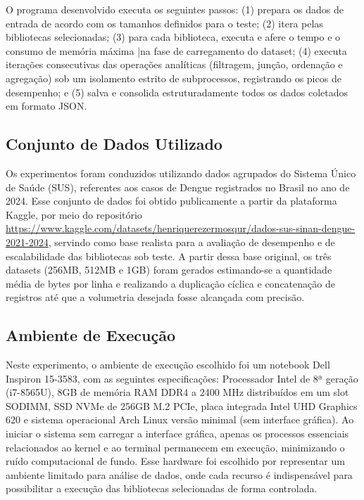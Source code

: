 \documentclass[12pt]{article}
\begin{document}
O programa desenvolvido executa os seguintes passos: (1) prepara os dados de entrada de acordo com
os tamanhos definidos para o teste; (2) itera pelas bibliotecas selecionadas; (3) para cada
biblioteca, executa e afere o tempo e o consumo de memória máxima |na fase de carregamento do
dataset; (4) executa iterações consecutivas das operações analíticas (filtragem, junção, ordenação e
agregação) sob um isolamento estrito de subprocessos, registrando os picos de desempenho; e (5)
salva e consolida estruturadamente todos os dados coletados em formato JSON\@.

\subsection{Conjunto de Dados Utilizado}

Os experimentos foram conduzidos utilizando dados agrupados do Sistema Único de Saúde (SUS), referentes aos casos de Dengue registrados no Brasil no ano de 2024. Esse conjunto de dados foi obtido publicamente a partir da plataforma Kaggle, por meio do repositório \url{https://www.kaggle.com/datasets/henriquerezermosqur/dados-sus-sinan-dengue-2021-2024}, servindo como base realista para a avaliação de desempenho e de escalabilidade das bibliotecas sob teste. A partir dessa base original, os três datasets (256MB, 512MB e 1GB) foram gerados estimando-se a quantidade média de bytes por linha e realizando a duplicação cíclica e concatenação de registros até que a volumetria desejada fosse alcançada com precisão. %

\subsection{Ambiente de Execução}


Neste experimento, o ambiente de execução escolhido foi um notebook Dell Inspiron \mbox{15-3583}, %
com as seguintes especificações: Processador Intel de 8ª geração (\mbox{i7-8565U}), 8GB de memória %
RAM DDR4 a 2400 MHz distribuídos em um slot SODIMM, SSD NVMe de 256GB M.2 PCIe, placa integrada
Intel UHD Graphics 620 e sistema operacional Arch Linux versão minimal (sem interface gráfica). Ao iniciar o sistema sem carregar a interface gráfica, apenas os processos essenciais relacionados ao kernel e ao terminal permanecem em execução, minimizando o ruído computacional de fundo. Esse
hardware foi escolhido por representar um ambiente limitado para análise de dados, onde cada recurso
é indispensável para possibilitar a execução das bibliotecas selecionadas de forma controlada.
\end{document}
